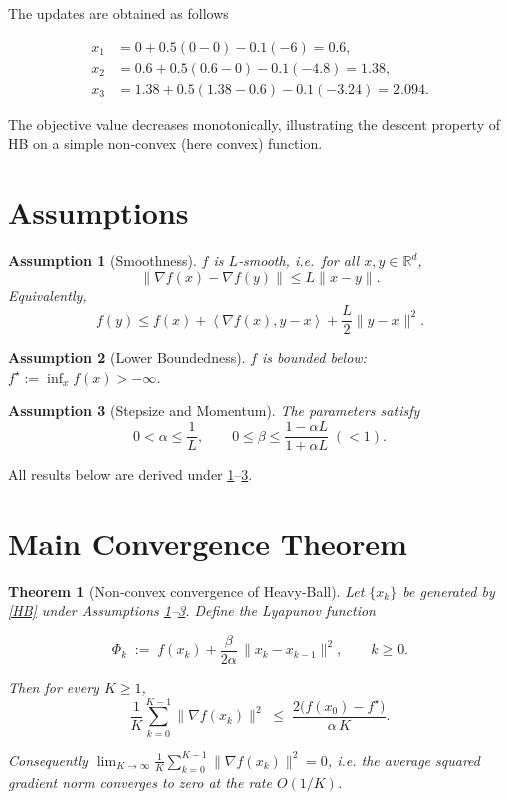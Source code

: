 \documentclass{article}
\newtheorem{theorem}{Theorem}
\newtheorem{assumption}{Assumption}
\newcommand{\inner}[2]{\left\langle #1,#2\right\rangle}
\begin{document}
The updates are obtained as follows  

\[
\begin{aligned}
x_{1}&=0+0.5(0-0)-0.1(-6)=0.6,\\
x_{2}&=0.6+0.5(0.6-0)-0.1(-4.8)=1.38,\\
x_{3}&=1.38+0.5(1.38-0.6)-0.1(-3.24)=2.094.
\end{aligned}
\]

The objective value decreases monotonically, illustrating the descent property of HB on a simple non‑convex (here convex) function.

\section*{Assumptions}
\begin{assumption}[Smoothness]\label{ass:smooth}
$f$ is $L$‑smooth, i.e.\ for all $x,y\in\mathbb{R}^d$,
\[
\|\nabla f(x)-\nabla f(y)\|\le L\|x-y\|.
\tag{A1}
\]
Equivalently,
\[
f(y)\le f(x)+\inner{\nabla f(x)}{y-x}+\frac{L}{2}\|y-x\|^2.
\tag{A1'}
\]
\end{assumption}

\begin{assumption}[Lower Boundedness]\label{ass:lower}
$f$ is bounded below: $f^\star:=\inf_{x}f(x)>-\infty$.
\end{assumption}

\begin{assumption}[Stepsize and Momentum]\label{ass:params}
The parameters satisfy  
\[
0<\alpha\le\frac{1}{L},\qquad
0\le\beta\le\frac{1-\alpha L}{1+\alpha L}\;(<1).
\tag{A3}
\]
\end{assumption}

All results below are derived under \ref{ass:smooth}–\ref{ass:params}.

\section*{Main Convergence Theorem}
\begin{theorem}[Non‑convex convergence of Heavy‑Ball]\label{thm:hb}
Let $\{x_k\}$ be generated by \eqref{HB} under Assumptions \ref{ass:smooth}–\ref{ass:params}.  
Define the Lyapunov function  

\[
\Phi_k\;:=\;f(x_k)+\frac{\beta}{2\alpha}\,\|x_k-x_{k-1}\|^2,\qquad k\ge0 .
\tag{T1}
\]

Then for every $K\ge1$,
\[
\frac{1}{K}\sum_{k=0}^{K-1}\|\nabla f(x_k)\|^2
\;\le\;
\frac{2\bigl(f(x_0)-f^\star\bigr)}{\alpha\,K}.
\tag{T2}
\]

Consequently $\displaystyle\lim_{K\to\infty}\frac{1}{K}\sum_{k=0}^{K-1}\|\nabla f(x_k)\|^2 =0$, i.e. the average squared gradient norm converges to zero at the rate $O(1/K)$.
\end{theorem}
\end{document}
